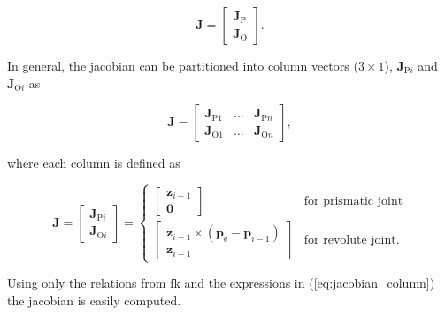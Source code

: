 \begin{equation}
    \boldsymbol{J} = \begin{bmatrix}
    \boldsymbol{J}_\text{P}\\
    \boldsymbol{J}_\text{O}
    \end{bmatrix}.
\end{equation}

In general, the jacobian can be partitioned into column vectors ($3\times1$), $\boldsymbol{J}_{\text{P}i}$ and $\boldsymbol{J}_{\text{O}i}$ as

\begin{equation}
    \boldsymbol{J} = \begin{bmatrix}
    \boldsymbol{J}_{\text{P}1} & \ldots & \boldsymbol{J}_{\text{P}n} \\
    \boldsymbol{J}_{\text{O}1} & \ldots & \boldsymbol{J}_{\text{O}n}
    \end{bmatrix},
\end{equation}

where each column is defined as

\begin{equation}
    \label{eq:jacobian_column}
    \boldsymbol{J} = \begin{bmatrix}
    \boldsymbol{J}_{\text{P}i}\\
    \boldsymbol{J}_{\text{O}i}
    \end{bmatrix} = \left\{ \begin{array}{cc}
        \begin{bmatrix}
            \boldsymbol{z}_{i-1}\\
            \boldsymbol{0}
        \end{bmatrix} & \text{for prismatic joint} \\
        \begin{bmatrix}
        \boldsymbol{z}_{i-1} \times (\boldsymbol{p}_\text{e} - \boldsymbol{p}_{i-1})\\
        \boldsymbol{z}_{i-1}
        \end{bmatrix} & \text{for revolute joint}.
    \end{array}\right.
\end{equation}

Using only the relations from \gls{fk} and the expressions in (\ref{eq:jacobian_column}) the jacobian is easily computed.



